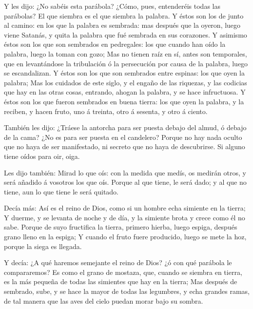  Y les dijo: ¿No sabéis esta parábola? ¿Cómo, pues,
entenderéis todas las parábolas?  El que siembra es el que
siembra la palabra.  Y éstos son los de junto al camino: en
los que la palabra es sembrada: mas después que la oyeron, luego viene
Satanás, y quita la palabra que fué sembrada en sus corazones.
 Y asimismo éstos son los que son sembrados en pedregales:
los que cuando han oído la palabra, luego la toman con gozo;
 Mas no tienen raíz en sí, antes son temporales, que en
levantándose la tribulación ó la persecución por causa de la palabra,
luego se escandalizan.  Y éstos son los que son sembrados
entre espinas: los que oyen la palabra;  Mas los cuidados
de este siglo, y el engaño de las riquezas, y las codicias que hay en
las otras cosas, entrando, ahogan la palabra, y se hace infructuosa.
 Y éstos son los que fueron sembrados en buena tierra: los
que oyen la palabra, y la reciben, y hacen fruto, uno á treinta, otro á
sesenta, y otro á ciento.

 También les dijo: ¿Tráese la antorcha para ser puesta
debajo del almud, ó debajo de la cama? ¿No es para ser puesta en el
candelero?  Porque no hay nada oculto que no haya de ser
manifestado, ni secreto que no haya de descubrirse.  Si
alguno tiene oídos para oir, oiga.

 Les dijo también: Mirad lo que oís: con la medida que
medís, os medirán otros, y será añadido á vosotros los que oís.
 Porque al que tiene, le será dado; y al que no tiene, aun
lo que tiene le será quitado.

 Decía más: Así es el reino de Dios, como si un hombre echa
simiente en la tierra;  Y duerme, y se levanta de noche y
de día, y la simiente brota y crece como él no sabe. 
Porque de suyo fructifica la tierra, primero hierba, luego espiga,
después grano lleno en la espiga;  Y cuando el fruto fuere
producido, luego se mete la hoz, porque la siega es llegada.

 Y decía: ¿A qué haremos semejante el reino de Dios? ¿ó con
qué parábola le compararemos?  Es como el grano de mostaza,
que, cuando se siembra en tierra, es la más pequeña de todas las
simientes que hay en la tierra;  Mas después de sembrado,
sube, y se hace la mayor de todas las legumbres, y echa grandes ramas,
de tal manera que las aves del cielo puedan morar bajo su sombra.

